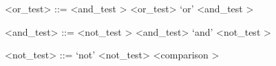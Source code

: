 
\label{orzzztestb}

\begin{grammar}
<or_test> ::= <and_test \myref[andzzztestb]>
	\alt <or_test> `or' <and_test \myref[andzzztestb]>
\end{grammar}


\label{andzzztestb}

\begin{grammar}
<and_test> ::= <not_test \myref[notzzztestb]>
	\alt <and_test> `and' <not_test \myref[notzzztestb]>
\end{grammar}


\label{notzzztestb}

\begin{grammar}
<not_test> ::= `not' <not_test>
	\alt <comparison \myref[comparisonb]>
\end{grammar}


